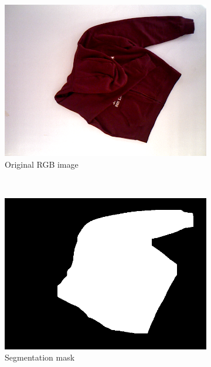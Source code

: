 \begin{figure}[htbp]
	\centering
    \begin{subfigure}[l]{0.49\textwidth}
	    \centering
    	\includegraphics[width=\textwidth]
    	{figures/segmentation_original.png}
    	\caption{Original RGB image}
	\end{subfigure}
	~
    \begin{subfigure}[r]{0.49\textwidth}
	    \centering
    	\includegraphics[width=\textwidth]
    	{figures/segmentation_mask.png}
    	\caption{Segmentation mask}
	\end{subfigure} 
    \caption{}
    \label{fig:segmentation_mask}
\end{figure}



